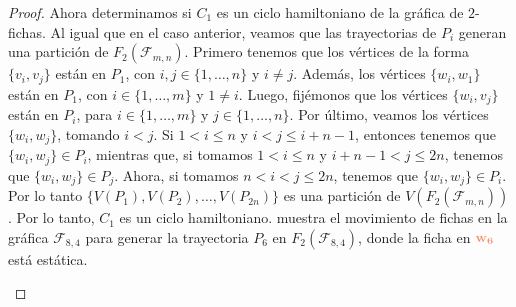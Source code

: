 \begin{proof}
    Ahora determinamos si $C_1$ es un ciclo hamiltoniano de la gr\'afica de
    $2$-fichas. Al igual que en el caso anterior, veamos que las trayectorias de
    $P_i$ generan una partici\'on de $F_2(\mathcal{F}_{m,n})$. Primero tenemos
    que los v\'ertices de la forma $\{v_i,v_j\}$ est\'an en $P_1$, con $i,j \in
    \{1, \dots, n\}$ y $i \neq j$. Adem\'as, los v\'ertices $\{w_i,w_1\}$
    est\'an en $P_1$, con $i \in \{1, \dots, m\}$ y $1 \neq i$. Luego,
    fij\'emonos que los v\'ertices $\{w_i,v_j\}$ est\'an en $P_i$, para $i\in
    \{1, \dots, m\}$ y $j \in \{1, \dots, n\}$. Por \'ultimo, veamos los
    v\'ertices $\{w_i,w_j\}$, tomando $i < j$. Si $1 < i \leq n$ y $i < j \leq
    i+n-1$, entonces tenemos que $\{w_i,w_j\} \in P_i$, mientras que, si tomamos
    $1 < i \leq n$ y $i+n-1 < j \leq 2n$, tenemos que $\{w_i,w_j\} \in P_j$.
    Ahora, si tomamos $n<i<j \leq 2n$, tenemos que $\{w_i,w_j\} \in P_i$. Por lo
    tanto $\{V(P_1),V(P_2), \dots, V(P_{2n})\}$ es una partici\'on de
    $V(F_2(\mathcal{F}_{m,n}))$. Por lo tanto, $C_1$ es un ciclo hamiltoniano.
     muestra el movimiento de fichas en la
    gr\'afica $\mathcal{F}_{8,4}$ para generar la trayectoria $P_6$ en
    $F_2(\mathcal{F}_{8,4})$, donde la ficha en ${\color{coral}\bf w_6}$ est\'a
    est\'atica.


\begin{figure}[ht!]
    \centering
\end{figure}
\end{proof}
